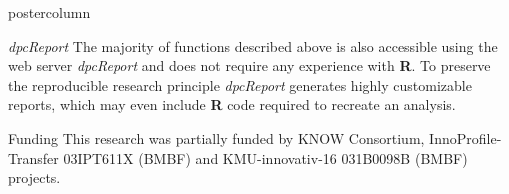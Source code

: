 \documentclass[final]{beamer}\usepackage[]{graphicx}\usepackage[]{color}
\begin{document}
\begin{frame}
\begin{columns}
\begin{column}{.54\textwidth}
\begin{beamercolorbox}[center,wd=\textwidth]{postercolumn}
\begin{minipage}[T]{.95\textwidth}
{\begin{block}{\textit{dpcReport}}
The majority of functions described above is also accessible using the web server \textit{dpcReport} and does not require any experience with \textbf{R}. To preserve the reproducible research principle \textit{dpcReport} generates highly customizable reports, which may even include \textbf{R} code required to recreate an analysis.

\end{block}
\vfill

\begin{block}{Funding}
\footnotesize{
This research was partially funded by KNOW Consortium, InnoProfile-Transfer 03IPT611X (BMBF) and 
KMU-innovativ-16 031B0098B (BMBF) projects.
}
\end{block}
\vfill 

}
\end{minipage}
\end{beamercolorbox}
\end{column}
\end{columns}  
\end{frame}
\end{document}
